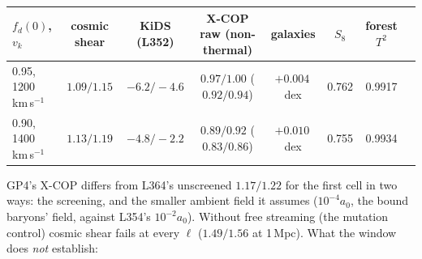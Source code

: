 \documentclass[10pt]{article}
\begin{document}
{\footnotesize\centering
\begin{tabular}{@{}lccccccc@{}}
\toprule
$f_d(0)$, $v_k$ & cosmic shear & KiDS (L352) & X-COP raw (non-thermal) & galaxies & $S_8$ & forest $T^2$\\
\midrule
0.95, 1200\,km\,s$^{-1}$ & $1.09/1.15$ & $-6.2/-4.6$ & $0.97/1.00$ ($0.92/0.94$) & $+0.004$\,dex & 0.762 & 0.9917\\
0.90, 1400\,km\,s$^{-1}$ & $1.13/1.19$ & $-4.8/-2.2$ & $0.89/0.92$ ($0.83/0.86$) & $+0.010$\,dex & 0.755 & 0.9934\\
\bottomrule
\end{tabular}\par}
\smallskip
GP4's X-COP differs from L364's unscreened $1.17/1.22$ for the first cell in two ways: the screening, and the smaller ambient field it assumes ($10^{-4}a_0$, the bound baryons' field, against L354's $10^{-2}a_0$). Without free streaming (the mutation control) cosmic shear fails at every $\ell$ ($1.49/1.56$ at 1\,Mpc).
What the window does \emph{not} establish:
\end{document}
